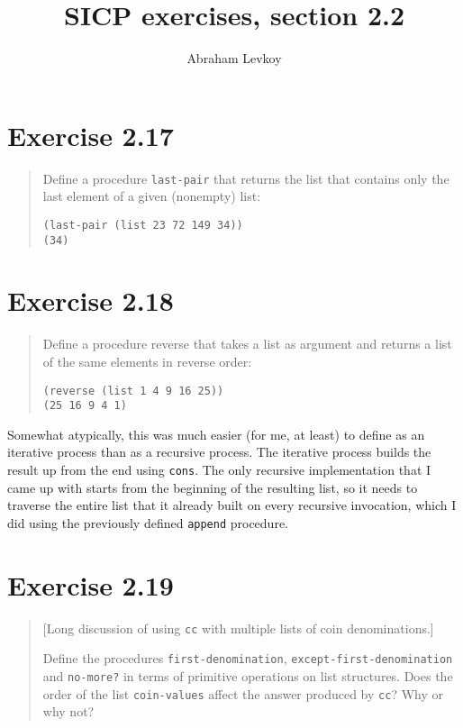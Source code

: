 \documentclass{article}
\author{Abraham Levkoy}
\title{SICP exercises, section 2.2}
\begin{document}
\maketitle

\section{Exercise 2.17}
\begin{quote}
    Define a procedure \texttt{last-pair} that returns the list that contains
    only the last element of a given (nonempty) list:
    \begin{lstlisting}
(last-pair (list 23 72 149 34))
(34)
    \end{lstlisting}
\end{quote}



\section{Exercise 2.18}
\begin{quote}
    Define a procedure reverse that takes a list as argument and returns a list
    of the same elements in reverse order:
    \begin{lstlisting}
(reverse (list 1 4 9 16 25))
(25 16 9 4 1)
    \end{lstlisting}
\end{quote}



Somewhat atypically, this was much easier (for me, at least) to define as an
iterative process than as a recursive process. The iterative process builds the
result up from the end using \texttt{cons}. The only recursive implementation
that I came up with starts from the beginning of the resulting list, so it
needs to traverse the entire list that it already built on every recursive
invocation, which I did using the previously defined \texttt{append} procedure.

\section{Exercise 2.19}
\begin{quote}
    [Long discussion of using \texttt{cc} with multiple lists of coin
    denominations.]

    Define the procedures \texttt{first-denomination},
    \texttt{except-first-denomination} and \texttt{no-more?} in terms of
    primitive operations on list structures. Does the order of the list
    \texttt{coin-values} affect the answer produced by \texttt{cc}? Why or why
    not?
\end{quote}
\end{document}
